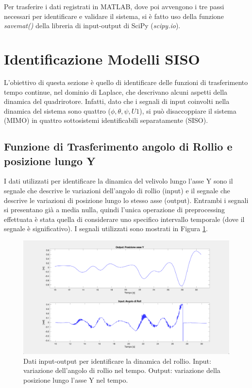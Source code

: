 Per trasferire i dati registrati in MATLAB, dove poi avvengono i tre passi necessari per identificare e validare il sistema, si è fatto uso della funzione \emph{savemat()} della libreria di input-output di SciPy (\emph{scipy.io}).


\section{Identificazione Modelli SISO}
L'obiettivo di questa sezione è quello di identificare delle funzioni di trasferimento tempo continue, nel dominio di Laplace, che descrivano alcuni aspetti della dinamica del quadrirotore. Infatti, dato che i segnali di input coinvolti nella dinamica del sistema sono quattro ($\phi, \theta, \psi, U1$), si può disaccoppiare il sistema (\acs{MIMO}) in quattro sottosistemi identificabili separatamente (\acs{SISO}).\\

\subsection{Funzione di Trasferimento angolo di Rollio e posizione lungo Y}
I dati utilizzati per identificare la dinamica del velivolo lungo l'asse Y sono il segnale che descrive le variazioni dell'angolo di rollio (input) e il segnale che descrive le variazioni di posizione lungo lo stesso asse (output). Entrambi i segnali si presentano già a media nulla, quindi l'unica operazione di preprocessing effettuata è stata quella di considerare uno specifico intervallo temporale (dove il segnale è significativo). I segnali utilizzati sono mostrati in Figura \ref{fig:ry_input}.

\begin{figure}[H]
	\centering
	\includegraphics[width=1\textwidth]{gfx/SysId/ry_input}
	\caption[Dati input-output per identificare la dinamica del rollio.]{Dati input-output per identificare la dinamica del rollio. Input: variazione dell'angolo di rollio nel tempo. Output: variazione della posizione lungo l'asse Y nel tempo.}
	\label{fig:ry_input}
\end{figure}

